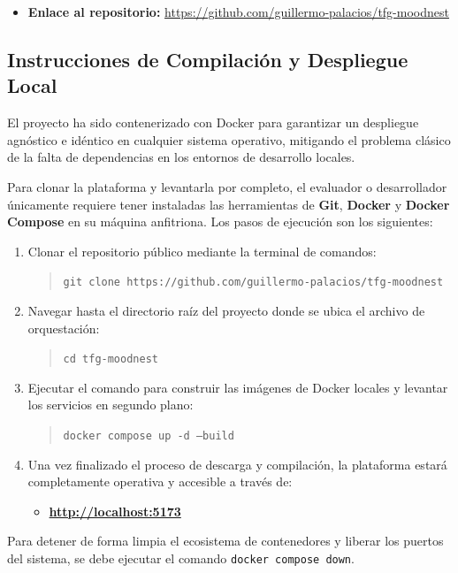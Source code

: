 \begin{itemize}
    \item \textbf{Enlace al repositorio:} \url{https://github.com/guillermo-palacios/tfg-moodnest}
\end{itemize}

\subsection{Instrucciones de Compilación y Despliegue Local}

El proyecto ha sido contenerizado con Docker para garantizar un despliegue agnóstico e idéntico en cualquier sistema operativo, mitigando el problema clásico de la falta de dependencias en los entornos de desarrollo locales.

Para clonar la plataforma y levantarla por completo, el evaluador o desarrollador únicamente requiere tener instaladas las herramientas de \textbf{Git}, \textbf{Docker} y \textbf{Docker Compose} en su máquina anfitriona. Los pasos de ejecución son los siguientes:

\begin{enumerate}
    \item Clonar el repositorio público mediante la terminal de comandos:
    \begin{quote}
        \texttt{git clone https://github.com/guillermo-palacios/tfg-moodnest}
    \end{quote}
    \item Navegar hasta el directorio raíz del proyecto donde se ubica el archivo de orquestación:
    \begin{quote}
        \texttt{cd tfg-moodnest}
    \end{quote}
    \item Ejecutar el comando para construir las imágenes de Docker locales y levantar los servicios en segundo plano:
    \begin{quote}
        \texttt{docker compose up -d --build}
    \end{quote}
    \item Una vez finalizado el proceso de descarga y compilación, la plataforma estará completamente operativa y accesible a través de:
    \begin{itemize}
        \item \textbf{\url{http://localhost:5173}} 
    \end{itemize}
\end{enumerate}

Para detener de forma limpia el ecosistema de contenedores y liberar los puertos del sistema, se debe ejecutar el comando \texttt{docker compose down}.